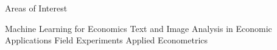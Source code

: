 
\def\arraystretch{1.3}
\begin{rubric}{Areas of Interest}

\entry*[] Machine Learning for Economics
\entry*[] Text and Image Analysis in Economic Applications
\entry*[] Field Experiments
\entry*[] Applied Econometrics


\end{rubric}



